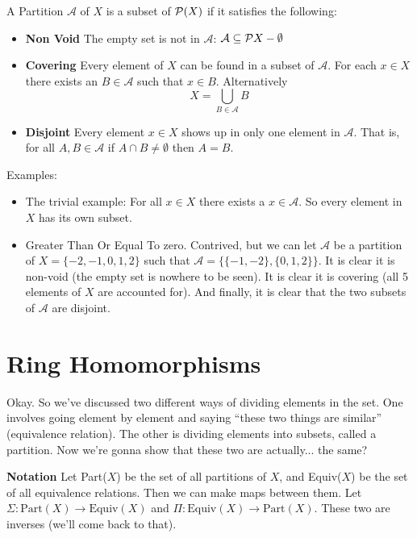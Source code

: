  A Partition \(\mathcal{A}\) of \(X\) is a subset of \(\mathcal{P}(X)\) if it satisfies the following:
\begin{itemize}
    \item \textbf{Non Void} The empty set is not in \(\mathcal{A}\): \(\mathcal{A} \subseteq \mathcal{P}{X} - \emptyset\)

    \item \textbf{Covering} Every element of \(X\) can be found in a subset of \(\mathcal{A}\). For each \(x \in X\) there exists an \(B \in \mathcal{A}\) such that \(x \in B\). Alternatively
          \[X = \bigcup_{B\in \mathcal{A}}{B}\]

    \item \textbf{Disjoint} Every element \(x \in X\) shows up in only one element in \(\mathcal{A}\). That is, for all \(A, B \in \mathcal{A}\) if \(A \cap B \neq \emptyset\) then \(A = B\).
\end{itemize}

Examples:

\begin{itemize}
    \item The trivial example: For all \(x \in X\) there exists a \({x} \in \mathcal{A}\). So every element in \(X\) has its own subset.

    \item Greater Than Or Equal To zero. Contrived, but we can let \(\mathcal{A}\) be a partition of \(X = \{-2,-1, 0, 1, 2\}\) such that \(\mathcal{A} = \{\{-1, -2\},\{0, 1, 2\}\}\). It is clear it is non-void (the empty set is nowhere to be seen). It is clear it is covering (all 5 elements of \(X\) are accounted for). And finally, it is clear that the two subsets of \(\mathcal{A}\) are disjoint.
\end{itemize}

\section{Ring Homomorphisms}

Okay. So we've discussed two different ways of dividing elements in the set. One involves going element by element and saying ``these two things are similar'' (equivalence relation). The other is dividing elements into subsets, called a partition. Now we're gonna show that these two are actually... the same?

\textbf{Notation} Let Part(\(X\)) be the set of all partitions of \(X\), and Equiv(\(X\)) be the set of all equivalence relations. Then we can make maps between them. Let \(\Sigma:\text{Part}(X) \rightarrow \text{Equiv}(X)\) and \(\Pi: \text{Equiv}(X) \rightarrow \text{Part}(X)\). These two are inverses (we'll come back to that).

